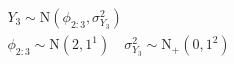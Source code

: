 \begin{equation}
\begin{gathered}
  Y_{3} \sim \text{N}(\phi_{2:3}, \sigma^{2}_{Y_{3}}) \\
  \phi_{2:3} \sim \text{N}(2, 1^1) \quad
  \sigma^{2}_{Y_{3}} \sim \text{N}_{+}(0, 1^2)
  \label{eqn:model-3-specification}  
\end{gathered}
\end{equation}